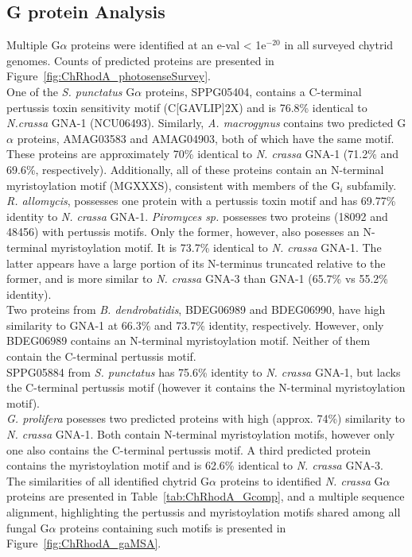 \subsection*{G protein Analysis}
Multiple G$\alpha$ proteins were identified at an e-val < 1e$^{-20}$ in all surveyed chytrid genomes. Counts of predicted proteins are presented in Figure~\ref{fig:ChRhodA_photosenseSurvey}.\\
\indent One of the \textit{S. punctatus} G$\alpha$ proteins, SPPG05404, contains a C-terminal pertussis toxin sensitivity motif (C[GAVLIP]{2}X) and is 76.8\% identical to \textit{N.crassa} GNA-1 (NCU06493). Similarly, \textit{A. macrogynus} contains two predicted G$\alpha$ proteins, AMAG03583 and AMAG04903, both of which have the same motif. These proteins are approximately 70\% identical to \textit{N. crassa} GNA-1 (71.2\% and 69.6\%, respectively). Additionally, all of these proteins contain an N-terminal myristoylation motif (MGXXXS), consistent with members of the G$_{i}$ subfamily. \textit{R. allomycis}, possesses one protein with a pertussis toxin motif and has 69.77\% identity to \textit{N. crassa} GNA-1. \textit{Piromyces sp.} possesses two proteins (18092 and 48456) with pertussis motifs. Only the former, however, also posesses an N-terminal myristoylation motif. It is 73.7\% identical to \textit{N. crassa} GNA-1. The latter appears have a large portion of its N-terminus truncated relative to the former, and is more similar to \textit{N. crassa} GNA-3 than GNA-1 (65.7\% vs 55.2\% identity).\\
\indent Two proteins from \textit{B. dendrobatidis}, BDEG06989 and BDEG06990, have high similarity to GNA-1 at 66.3\% and 73.7\% identity, respectively. However, only BDEG06989 contains an N-terminal myristoylation motif. Neither of them contain the C-terminal pertussis motif.\\
\indent SPPG05884 from \textit{S. punctatus} has 75.6\% identity to \textit{N. crassa} GNA-1, but lacks the C-terminal pertussis motif (however it contains the N-terminal myristoylation motif).\\
\indent \textit{G. prolifera} posesses two predicted proteins with high (approx. 74\%) similarity to \textit{N. crassa} GNA-1. Both contain N-terminal myristoylation motifs, however only one also contains the C-terminal pertussis motif. A third predicted protein contains the myristoylation motif and is 62.6\% identical to \textit{N. crassa} GNA-3.\\
\indent The similarities of all identified chytrid G$\alpha$ proteins to identified \textit{N. crassa} G$\alpha$ proteins are presented in Table~\ref{tab:ChRhodA_Gcomp}, and a multiple sequence alignment, highlighting the pertussis and myristoylation motifs shared among all fungal G$\alpha$ proteins containing such motifs is presented in Figure~\ref{fig:ChRhodA_gaMSA}.\\
